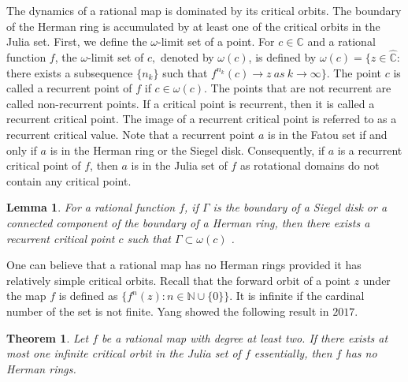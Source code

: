 \documentclass[12pt]{article}
\newtheorem{theorem}{Theorem}[section]
\newtheorem{lemma}{Lemma}[section]
\begin{document}
The dynamics of a rational map is dominated by its critical orbits. The boundary of the Herman ring is accumulated by at least one of the critical orbits in the Julia set. First, we define the $\omega$-limit set of a point. For  $c\in \mathbb{C}$ and a rational function $f$, the $\omega$-limit set of $c,$ denoted by $\omega(c)$, is defined by
$\omega(c)=\{z\in\widehat{\mathbb{C}}:$ there exists a subsequence $\{n_k\}$ such that $f^{n_k}(c)\to z\ as\ k\to \infty\}$.  The point $c$ is called a recurrent point of $f$ if $c\in\omega(c)$. The points that are not recurrent are called non-recurrent points. If a critical point is recurrent, then it is called a recurrent critical point. The image of a recurrent critical point is referred to as a recurrent critical value. Note that a recurrent point $a$ is in the Fatou set if and only if $a$ is in the Herman ring or the  Siegel disk. Consequently, if $a$ is a recurrent critical point of $f$, then $a$ is in the Julia set of $f$ as rotational domains do not contain any critical point. 
\begin{lemma}
For a rational function $f$, if $\Gamma$ is the boundary of a Siegel disk or a connected component of the boundary of a Herman ring, then there exists a recurrent critical point $c$ such that $\Gamma\subset \omega(c)$ \cite{mane}.	
\end{lemma}
 One can believe that a rational map has no Herman rings provided it has relatively simple critical orbits. Recall that the forward orbit of a point $z$ under the map $f$ is defined as $\{f^{n}(z): n\in \mathbb{N}\cup \{0\}\}$. It is infinite if the cardinal number of the set is not finite. Yang showed the following result \cite{yang2017rational} in $2017$.
\begin{theorem}\label{noherman}
	Let $f$ be a rational map with degree at least two. If there exists at most one infinite critical orbit in the Julia set of $f$ essentially, then $f$ has no Herman rings.
\end{theorem} 
\end{document}

